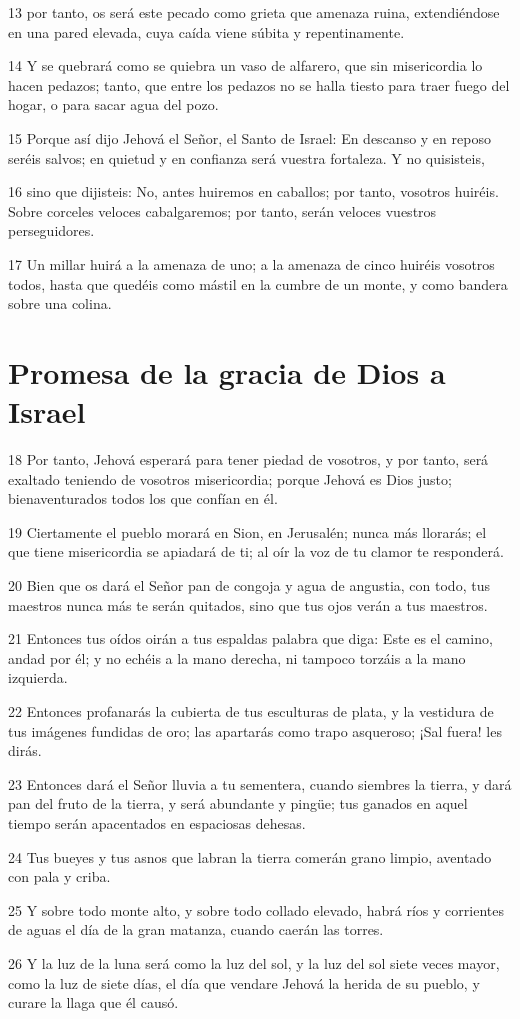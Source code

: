\par 13 por tanto, os será este pecado como grieta que amenaza ruina, extendiéndose en una pared elevada, cuya caída viene súbita y repentinamente.
\par 14 Y se quebrará como se quiebra un vaso de alfarero, que sin misericordia lo hacen pedazos; tanto, que entre los pedazos no se halla tiesto para traer fuego del hogar, o para sacar agua del pozo.
\par 15 Porque así dijo Jehová el Señor, el Santo de Israel: En descanso y en reposo seréis salvos; en quietud y en confianza será vuestra fortaleza. Y no quisisteis,
\par 16 sino que dijisteis: No, antes huiremos en caballos; por tanto, vosotros huiréis. Sobre corceles veloces cabalgaremos; por tanto, serán veloces vuestros perseguidores.
\par 17 Un millar huirá a la amenaza de uno; a la amenaza de cinco huiréis vosotros todos, hasta que quedéis como mástil en la cumbre de un monte, y como bandera sobre una colina. 

\section*{Promesa de la gracia de Dios a Israel}

\par 18 Por tanto, Jehová esperará para tener piedad de vosotros, y por tanto, será exaltado teniendo de vosotros misericordia; porque Jehová es Dios justo; bienaventurados todos los que confían en él.
\par 19 Ciertamente el pueblo morará en Sion, en Jerusalén; nunca más llorarás; el que tiene misericordia se apiadará de ti; al oír la voz de tu clamor te responderá.
\par 20 Bien que os dará el Señor pan de congoja y agua de angustia, con todo, tus maestros nunca más te serán quitados, sino que tus ojos verán a tus maestros.
\par 21 Entonces tus oídos oirán a tus espaldas palabra que diga: Este es el camino, andad por él; y no echéis a la mano derecha, ni tampoco torzáis a la mano izquierda.
\par 22 Entonces profanarás la cubierta de tus esculturas de plata, y la vestidura de tus imágenes fundidas de oro; las apartarás como trapo asqueroso; ¡Sal fuera! les dirás.
\par 23 Entonces dará el Señor lluvia a tu sementera, cuando siembres la tierra, y dará pan del fruto de la tierra, y será abundante y pingüe; tus ganados en aquel tiempo serán apacentados en espaciosas dehesas.
\par 24 Tus bueyes y tus asnos que labran la tierra comerán grano limpio, aventado con pala y criba.
\par 25 Y sobre todo monte alto, y sobre todo collado elevado, habrá ríos y corrientes de aguas el día de la gran matanza, cuando caerán las torres.
\par 26 Y la luz de la luna será como la luz del sol, y la luz del sol siete veces mayor, como la luz de siete días, el día que vendare Jehová la herida de su pueblo, y curare la llaga que él causó.

